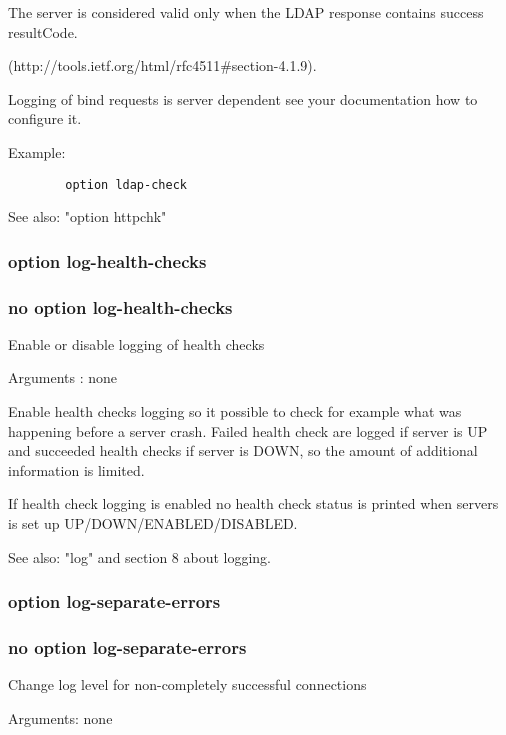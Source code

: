   The server is considered valid only when the LDAP response contains success resultCode.
  
  (http://tools.ietf.org/html/rfc4511#section-4.1.9).

  Logging of bind requests is server dependent see your documentation how to
  configure it.

  Example:
\begin{verbatim}
        option ldap-check
\end{verbatim}

  See also: "option httpchk"


\subsubsection{option log-health-checks}
\subsubsection{no option log-health-checks}


  Enable or disable logging of health checks


  Arguments : none

  Enable health checks logging so it possible to check for example what
  was happening before a server crash. Failed health check are logged if
  server is UP and succeeded health checks if server is DOWN, so the amount
  of additional information is limited.

  If health check logging is enabled no health check status is printed
  when servers is set up UP/DOWN/ENABLED/DISABLED.

  See also: "log" and section 8 about logging.

\subsubsection{option log-separate-errors}
\subsubsection{no option log-separate-errors}


  Change log level for non-completely successful connections


  Arguments: none


